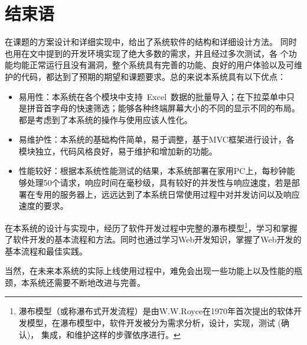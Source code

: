 
\chapter{结束语}
在课题的方案设计和详细实现中，给出了系统软件的结构和详细设计方法。
同时也用在文中提到的开发环境实现了绝大多数的需求，并且经过多次测试，各
个功能均能正常运行且没有漏洞，整个系统具有完善的功能、良好的用户体验以及可维护的代码，都达到了预期的期望和课题要求。总的来说本系统具有以下优点：

\begin{itemize}
\item 易用性：本系统在各个模块中支持~Excel~数据的批量导入；在下拉菜单中只是拼音首字母的快速筛选；能够各种终端屏幕大小的不同的显示不同的布局。都是考虑到了本系统的操作与使用应该人性化。
\item 易维护性：本系统的基础构件简单，易于调整，基于MVC框架进行设计，各模块独立，代码风格良好，易于维护和增加新的功能。
\item 性能较好：根据本系统性能测试的结果，本系统部署在家用PC上，每秒钟能够处理50个请求，响应时间在毫秒级，具有较好的并发性与响应速度，若是部署在专用的服务器上，远远达到了本系统日常使用过程中对并发访问以及响应速度的要求。
\end{itemize}


在本系统的设计与实现中，经历了软件开发过程中完整的瀑布模型\footnote{瀑布模型（或称瀑布式开发流程）是由W.W.Royce在1970年首次提出的软体开发模型，在瀑布模型中，软件开发被分为需求分析，设计，实现，测试 (确认)， 集成，和维护这样的步骤依序进行。}，学习和掌握了软件开发的基本流程和方法。同时也通过学习Web开发知识，掌握了Web开发的基本流程和最佳实践。

当然，在未来本系统的实际上线使用过程中，难免会出现一些功能上以及性能的瓶颈，本系统还需要不断地改进与完善。